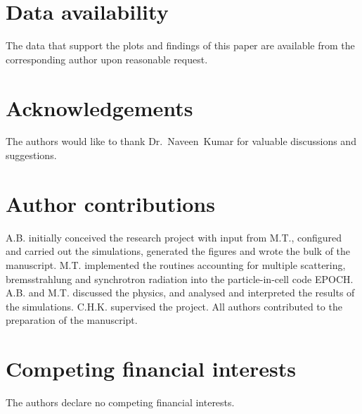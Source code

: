 \documentclass[fleqn,11pt]{wlscirep}
\begin{document}
\section*{Data availability}

The data that support the plots and findings of this paper are available from the corresponding author upon reasonable request.


{}


\section*{Acknowledgements}

The authors would like to thank Dr.~Naveen~Kumar for valuable discussions and suggestions.


\section*{Author contributions}

A.B. initially conceived the research project with input from M.T., configured and carried out the simulations, generated the figures and wrote the bulk of the manuscript. M.T. implemented the routines accounting for multiple scattering, bremsstrahlung and synchrotron radiation into the particle-in-cell code EPOCH. A.B. and M.T. discussed the physics, and analysed and interpreted the results of the simulations. C.H.K. supervised the project. All authors contributed to the preparation of the manuscript.


\section*{Competing financial interests}

The authors declare no competing financial interests.
\end{document}
